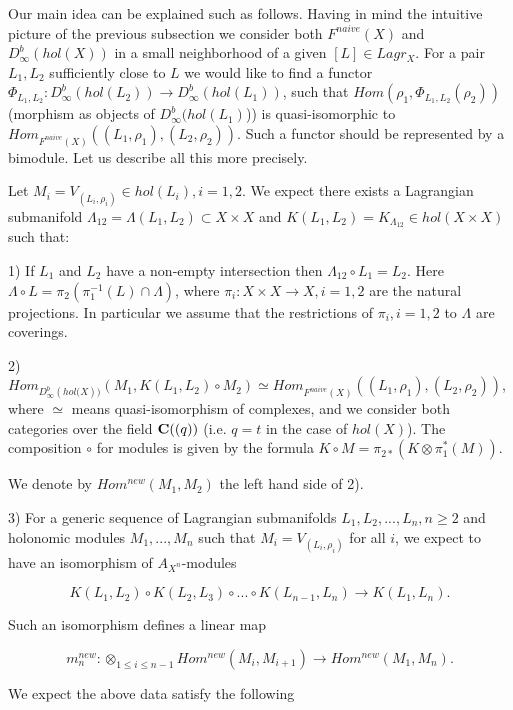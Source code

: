 \documentclass[a4paper,12pt]{article}
\begin{document}
Our main idea can be explained such as follows. Having in mind the intuitive picture of the previous
subsection we consider both $F^{naive}(X)$ and $D^b_{\infty}(hol(X))$ in a small
neighborhood of a given $[L]\in Lagr_X$. For a pair $L_1,L_2$ sufficiently close to
$L$ we would like to find a functor 
$\Phi_{L_1,L_2}:D^b_{\infty}(hol({L_2}))\to D^b_{\infty}(hol({L_1}))$, such
that $Hom(\rho_1,\Phi_{L_1,L_2}(\rho_2))$ (morphism as objects of
$D^b_{\infty}(hol({L_1})$)) is quasi-isomorphic to $Hom_{F^{naive}(X)}((L_1,\rho_1),(L_2,\rho_2))$.
Such a functor should be represented by a bimodule. Let us describe all this more precisely.



Let $M_{i}=V_{(L_i,\rho_i)}\in hol({L_i}), i=1,2$.
We expect there exists a Lagrangian submanifold $\Lambda_{12}=\Lambda(L_1,L_2)\subset
X\times X$ and $K(L_1,L_2)=K_{\Lambda_{12}}\in hol({X\times X})$ such that:

1) If $L_1$ and $L_2$ have a non-empty intersection then
 $\Lambda_{12}\circ L_1=L_2$. Here $\Lambda\circ L=
\pi_2(\pi^{-1}_1(L)\cap \Lambda)$, where $\pi_i:X\times X\to X, i=1,2$ are
the natural projections. In particular we assume that the restrictions of
$\pi_i, i=1,2$ to $\Lambda$ are coverings.



2) $Hom_{D^b_{\infty}({hol(X}))}(M_{1},K(L_1,L_2)\circ M_{2})\simeq
Hom_{F^{naive}(X)}((L_1,\rho_{1}),(L_2,\rho_{2}))$, where 
 $\simeq$ means  quasi-isomorphism
of complexes, and we consider both categories over the field ${\bf C}((q))$
(i.e. $q=t$ in the case of $hol(X)$).
The composition $\circ$ for modules
is given by the formula
$K\circ M=\pi_{2\ast}(K\otimes \pi_1^{\ast}(M))$.
 
We denote by $Hom^{new}(M_{1},M_{2})$ the left hand side of 2).



3) For a generic sequence of Lagrangian submanifolds $L_1,L_2,...,L_n, n\ge 2$
and holonomic modules $M_{1},...,M_{n}$ such that $M_{i}=V_{(L_i,\rho_i)}$
for all $i$, we expect to have an isomorphism of ${A}_{X^n}$-modules

$$K(L_1,L_2)\circ K(L_2,L_3)\circ...\circ K(L_{n-1},L_n)
\to K(L_1,L_n).$$

Such an isomorphism defines a linear map

$$m_n^{new}:\otimes_{1\le i\le n-1}Hom^{new}(M_{i},M_{{i+1}})\to
Hom^{new}(M_{1},M_{n}).$$




We expect the above data satisfy the following
\end{document}
